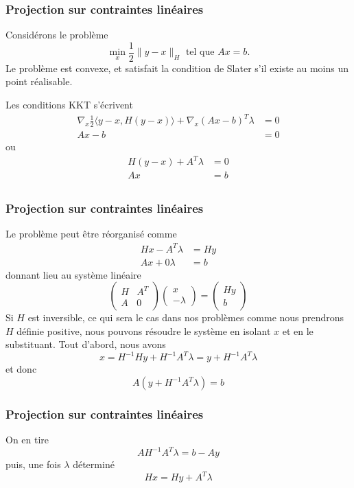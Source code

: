 \documentclass[usepdftitle=false,aspectratio=169]{beamer}
\begin{document}
\begin{frame}
	\frametitle{Projection sur contraintes linéaires}
	
	Considérons le problème
	$$
	\min_x \frac{1}{2} \| y - x \|_H \mbox{ tel que } Ax = b.
	$$
	Le problème est convexe, et satisfait la condition de Slater s'il existe au moins un point réalisable.

	Les conditions KKT s'écrivent
	\begin{align*}
	\nabla_x \frac{1}{2} \langle y-x, H(y-x) \rangle
	+ \nabla_x(Ax - b)^T \lambda &= 0 \\
	Ax - b & = 0 %
	\end{align*}
	ou
	\begin{align*}
	H(y-x) + A^T \lambda &= 0 \\
	Ax & = b \\
	\end{align*}
	
\end{frame}

\begin{frame}
	\frametitle{Projection sur contraintes linéaires}
	
	Le problème peut être réorganisé comme
	\begin{align*}
	Hx - A^T \lambda &= Hy \\
	Ax + 0\lambda & = b
	\end{align*}
	donnant lieu au système linéaire
	$$
	\begin{pmatrix}
	H & A^T \\ A & 0
	\end{pmatrix}
	\begin{pmatrix}
	x \\ -\lambda
	\end{pmatrix}
	=
	\begin{pmatrix}
	Hy \\ b
	\end{pmatrix}
	$$
	Si $H$ est inversible, ce qui sera le cas dans nos problèmes comme nous prendrons $H$ définie positive, nous pouvons résoudre le système en isolant $x$ et en le substituant.
	Tout d'abord, nous avons
	$$
	x = H^{-1}Hy+H^{-1}A^T \lambda = y+H^{-1}A^T \lambda
	$$
	et donc
	$$
	A\left(y+H^{-1}A^T \lambda\right) = b
	$$
	
\end{frame}

\begin{frame}
	\frametitle{Projection sur contraintes linéaires}
	
	On en tire
	$$
	AH^{-1}A^T \lambda = b - Ay
	$$
	puis, une fois $\lambda$ déterminé
	$$
	Hx = Hy + A^T \lambda
	$$
	
	
\end{frame}
\end{document}
